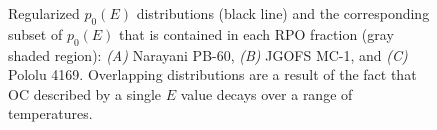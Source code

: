 \begin{figure}[p]
	\caption[$p_{0}(E)$ distributions for all RPO fractions in all samples]{Regularized $p_{0}(E)$ distributions (black line) and the corresponding subset of $p_{0}(E)$ that is contained in each RPO fraction (gray shaded region): \textit{(A)} Narayani PB-60, \textit{(B)} JGOFS MC-1, and \textit{(C)} Pololu 4169. Overlapping distributions are a result of the fact that OC described by a single $E$ value decays over a range of temperatures.}
	\label{Ch3Fig:8} 
\end{figure}


